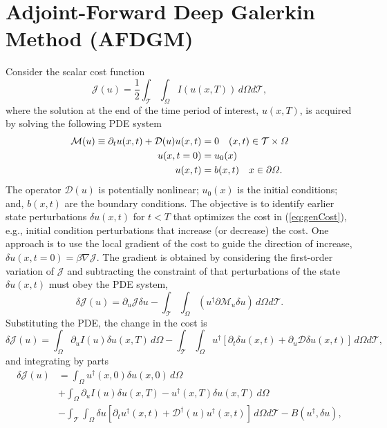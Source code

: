 \documentclass{jfm}
\begin{document}
\section{Adjoint-Forward Deep Galerkin Method (AFDGM)}
Consider the scalar cost function
\begin{equation}\label{eq:genCost}
    \mathcal{J}(u) = \frac{1}{2} \int_\mathcal{T} \int_\Omega I(u(x,T))\,d\Omega d\mathcal{T},
\end{equation}
where the solution at the end of the time period of interest, $u(x,T)$, is acquired by solving the following PDE system
\begin{align}\noindent 
    \mathcal{M}(u) \equiv \partial_t u(x,t) + \mathcal{D}(u) u(x,t) &= 0 \quad (x,t) \in \mathcal{T}\times \Omega\\
    u(x,t=0)&=u_0(x)\\
    u(x,t)&=b(x,t)\quad x \in \partial\Omega.
\end{align}
The operator $\mathcal{D}(u)$ is potentially nonlinear; $u_0(x)$ is the initial conditions; and, $b(x,t)$ are the boundary conditions.
The objective is to identify earlier state perturbations $\delta u(x,t)$ for $t<T$ that optimizes the cost in (\ref{eq:genCost}), e.g., initial condition perturbations that increase (or decrease) the cost. One approach is to use the local gradient of the cost to guide the direction of increase, $\delta u(x,t=0)=\beta \nabla \mathcal{J}$. The gradient is obtained by considering the first-order variation of $\mathcal{J}$ and subtracting the constraint of that perturbations of the state $\delta u(x,t)$ must obey the PDE system,
\begin{equation}
    \delta \mathcal{J}(u) = \partial_u \mathcal{J} \delta u - \int_\mathcal{T} \int_\Omega (u^\dagger \partial \mathcal{M}_u \delta u )\,d\Omega d\mathcal{T}. \end{equation}
Substituting the PDE, the change in the cost is
\begin{equation}
    \delta \mathcal{J}(u) = \int_\Omega \partial_u I(u) \delta u(x,T)\,d\Omega - \int_\mathcal{T} \int_\Omega u^\dagger\left[\partial_t \delta u(x,t) + \partial_u\mathcal{D}\delta u(x,t) \right]\,d\Omega d\mathcal{T},
\end{equation}
and integrating by parts
\begin{align}\label{eq:expandedVarJ}
    \delta \mathcal{J}(u) &=\int_\Omega u^\dagger(x,0)\delta u(x,0)\,d\Omega\\\nonumber &+\int_\Omega \partial_u I(u) \delta u(x,T)-u^\dagger(x,T)\delta u(x,T)\,d\Omega \\\nonumber
    &- \int_\mathcal{T} \int_\Omega \delta u\left[\partial_t  u^\dagger(x,t) + \mathcal{D}^\dagger(u)u^\dagger(x,t) \right]\,d\Omega d\mathcal{T} - B(u^\dagger,\delta u),
\end{align}
\end{document}
